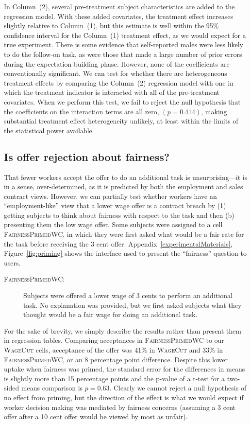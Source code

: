 \documentclass[11pt]{article}
\begin{document}
In Column~(2), several pre-treatment subject characteristics are added to the regression model.
With these added covariates, the treatment effect increases slightly relative to Column~(1), but this estimate is well within the 95\% confidence interval for the Column~(1) treatment effect, as we would expect for a true experiment. 
There is some evidence that self-reported males were less likely to do the follow-on task, as were those that made a large number of prior errors during the expectation building phase.
However, none of the coefficients are conventionally significant.
We can test for whether there are heterogeneous treatment effects by comparing the Column~(2) regression model with one in which the treatment indicator is interacted with all of the pre-treatment covariates.
When we perform this test, we fail to reject the null hypothesis that the coefficients on the interaction terms are all zero, $(p = 0.414)$, making substantial treatment effect heterogeneity unlikely, at least within the limits of the statistical power available.  

\subsection{Is offer rejection about fairness?}
That fewer workers accept the offer to do an additional task is unsurprising---it is in a sense, over-determined, as it is predicted by both the employment and sales contract views. 
However, we can partially test whether workers have an ``employment-like'' view that a lower wage offer is a contract breach by (1) getting subjects to think about fairness with respect to the task and then (b) presenting them the low wage offer. 
Some subjects were assigned to a cell \textsc{FairnessPrimedWC}, in which they were first asked what would be a fair rate for the task before receiving the 3 cent offer.
Appendix~\ref{experimentalMaterials}, Figure~\ref{fig:priming} shows the interface used to present the ``fairness'' question to users. 
\begin{description}   
\item[\textsc{FairnessPrimedWC:}] Subjects were offered a lower wage of 3 cents to perform an additional task.
No explanation was provided, but we first asked subjects what they thought would be a fair wage for doing an additional task.
\end{description}
For the sake of brevity, we simply describe the results rather than present them in regression tables. 
Comparing acceptances in \textsc{FairnessPrimedWC} to our \textsc{WageCut} cells, acceptance of the offer was 41\% in \textsc{WageCut} and 33\% in \textsc{FairnessPrimedWC}, or an 8 percentage point difference.
Despite this lower uptake when fairness was primed, the standard error for the differences in means is slightly more than 15 percentage points and the p-value of a t-test for a two-sided means comparison is $p=0.63$.
Clearly we cannot reject a null hypothesis of no effect from priming, but the direction of the effect is what we would expect if worker decision making was mediated by fairness concerns (assuming a 3 cent offer after a 10 cent offer would be viewed by most as unfair). 
\end{document}
